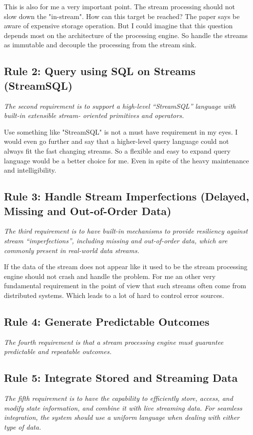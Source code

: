 \medskip
This is also for me a very important point. The stream processing should not slow down the "in-stream".
How can this target be reached? The paper says be aware of expensive storage operation.
But I could imagine that this question depends most on the architecture of the processing engine.
So handle the streams as immutable and decouple the processing from the stream sink.


\subsection{Rule 2: Query using SQL on Streams (StreamSQL)}
\textit{The second requirement is to support a high-level
        “StreamSQL” language with built-in extensible stream-
        oriented primitives and operators.}

\medskip
Use something like "StreamSQL" is not a must have requirement in my eyes.
I would even go further and say that a higher-level query language could not always fit the fast changing streams.
So a flexible and easy to expand query language would be a better choice for me.
Even in spite of the heavy maintenance and intelligibility.

\subsection{Rule 3: Handle Stream Imperfections (Delayed, Missing
and Out-of-Order Data)}
\textit{The third requirement is to have built-in mechanisms to
        provide resiliency against stream “imperfections”,
        including missing and out-of-order data, which are
        commonly present in real-world data streams.}

\medskip
If the data of the stream does not appear like it used to be the stream processing engine should not crash and handle the problem.
For me an other very fundamental requirement in the point of view that such streams often come from distributed systems.
Which leads to a lot of hard to control error sources.

\subsection{Rule 4: Generate Predictable Outcomes}
\textit{The fourth requirement is that a stream processing engine
        must guarantee predictable and repeatable outcomes.}


\subsection{Rule 5: Integrate Stored and Streaming Data}
\textit{The fifth requirement is to have the capability to efficiently
        store, access, and modify state information, and combine it
        with live streaming data. For seamless integration, the
        system should use a uniform language when dealing with
        either type of data.}

